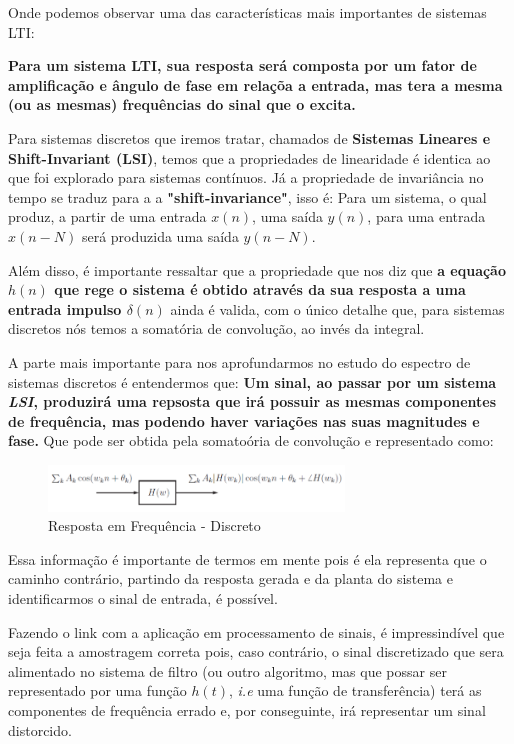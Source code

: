 \documentclass{article}
\begin{document}
Onde podemos observar uma das características mais importantes de sistemas LTI:
\begin{center}
    \textbf{Para um sistema LTI, sua resposta será composta por um fator de amplificação e ângulo de fase em relaçõa a entrada, mas tera a mesma (ou as mesmas) frequências do sinal que o excita.}
\end{center}

\newpage
Para sistemas discretos que iremos tratar, chamados de \textbf{Sistemas Lineares e Shift-Invariant (LSI)}, temos que a propriedades de linearidade é identica ao que foi explorado para sistemas contínuos. Já a propriedade de invariância no tempo se traduz para a a \textbf{"shift-invariance"}, isso é: Para um sistema, o qual produz, a partir de uma entrada $x(n)$, uma saída $y(n)$, para uma entrada $x(n-N)$ será produzida uma saída $y(n-N)$.

Além disso, é importante ressaltar que a propriedade que nos diz que \textbf{a equação $h(n)$ que rege o sistema é obtido através da sua resposta a uma entrada impulso $\delta(n)$} ainda é valida, com o único detalhe que, para sistemas discretos nós temos a somatória de convolução, ao invés da integral.

A parte mais importante para nos aprofundarmos no estudo do espectro de sistemas discretos é entendermos que: \textbf{Um sinal, ao passar por um sistema \emph{LSI}, produzirá uma repsosta que irá possuir as mesmas componentes de frequência, mas podendo haver variações nas suas magnitudes e fase.} Que pode ser obtida pela somatoória de convolução e representado como:
\begin{figure}[h]
    \centering
    \includegraphics[width=0.7\textwidth]{imgs/tf_discreto.png}
    \caption{Resposta em Frequência - Discreto}
    \label{fig:resposta_em_frequência_discreto}
\end{figure}

Essa informação é importante de termos em mente pois é ela representa que o caminho contrário, partindo da resposta gerada e da planta do sistema e identificarmos o sinal de entrada, é possível.

Fazendo o link com a aplicação em processamento de sinais, é impressindível que seja feita a amostragem correta pois, caso contrário, o sinal discretizado que sera alimentado no sistema de filtro (ou outro algoritmo, mas que possar ser representado por uma função $h(t)$, \emph{i.e} uma função de transferência) terá as componentes de frequência errado e, por conseguinte, irá representar um sinal distorcido.
\end{document}
